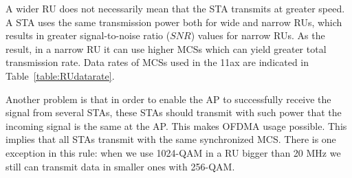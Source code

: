 A wider RU does not necessarily mean that the STA transmits at greater speed.
A STA uses the same transmission power both for wide and narrow RUs, which results in greater signal-to-noise ratio ($SNR$) values for narrow RUs.
As the result, in a narrow RU it can use higher MCSs which can yield greater total transmission rate. 
Data rates of MCSs used in the 11ax are indicated in Table~\ref{table:RUdatarate}. 

\begin{table}[t]
	{\centering
		\caption{\label{table:RUdatarate} Data rate in different RUs at each MCS in Mbps}
	}
\end{table}	

Another problem is that in order to enable the AP to successfully receive the signal from several STAs, these STAs should transmit with such power that the incoming signal is the same at the AP.
This makes OFDMA usage possible. 
This implies that all STAs transmit with the same synchronized MCS. 
There is one exception in this rule: when we use 1024-QAM in a RU bigger than 20 MHz we still can transmit data in smaller ones with 256-QAM. 

